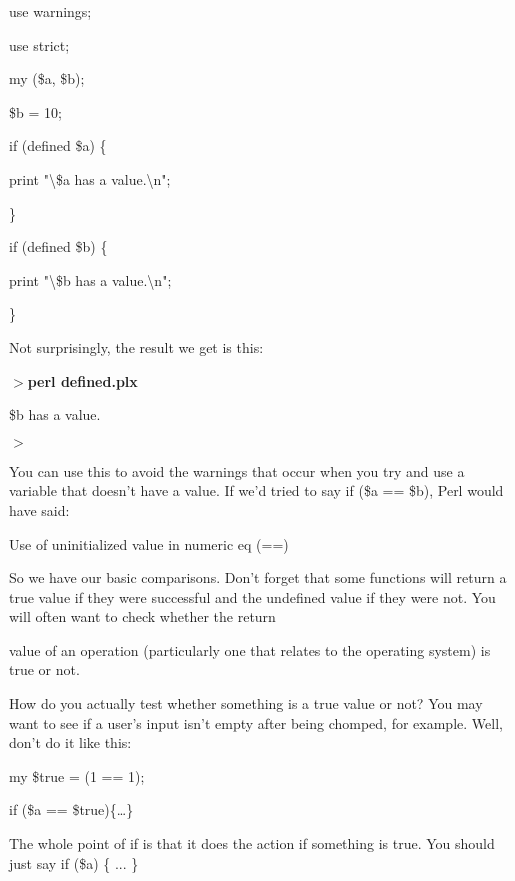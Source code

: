 \documentclass[a4paper,11pt]{book}
\begin{document}
\noindent use warnings;

\noindent use strict;

\noindent 

\noindent my (\$a, \$b);

\noindent \$b = 10;

\noindent if (defined \$a) \{

\noindent print "\textbackslash \$a has a value.\textbackslash n";

\noindent \}

\noindent if (defined \$b) \{

\noindent print "\textbackslash \$b has a value.\textbackslash n";

\noindent \}

\noindent 

\noindent Not surprisingly, the result we get is this:

\noindent 

\noindent $>$\textbf{perl defined.plx}

\noindent \$b has a value.

\noindent $>$

\noindent 

\noindent You can use this to avoid the warnings that occur when you try and use a variable that doesn't have a value. If we'd tried to say if (\$a == \$b), Perl would have said:

\noindent 

\noindent Use of uninitialized value in numeric eq (==)

\noindent 

\noindent So we have our basic comparisons. Don't forget that some functions will return a true value if they were successful and the undefined value if they were not. You will often want to check whether the return

\noindent value of an operation (particularly one that relates to the operating system) is true or not.

\noindent 

\noindent How do you actually test whether something is a true value or not? You may want to see if a user's input isn't empty after being chomped, for example. Well, don't do it like this:

\noindent 

\noindent my \$true = (1 == 1);

\noindent if (\$a == \$true)\{\dots \} 

\noindent 

\noindent The whole point of if is that it does the action if something is true. You should just say if (\$a) \{ ... \}
\end{document}
